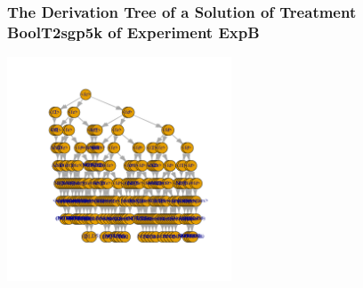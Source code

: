  \begin{frame}
 \frametitle{ The Derivation Tree of a Solution of Treatment BoolT2sgp5k of Experiment ExpB }
 \begin{center}
\includegraphics[width=0.5\textwidth, angle=0]
{ExpBDerivationTreeFigure013.pdf}
 \end{center}
 \label{report/ExpBDerivationTreeFigure013.pdf}  
 \end{frame}

